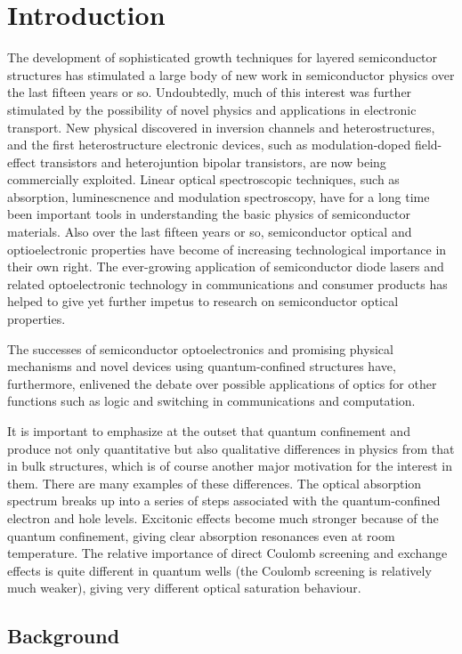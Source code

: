 \chapter{Introduction}

The development of sophisticated growth techniques for layered semiconductor
structures has stimulated a large body of new work in semiconductor physics
over the last fifteen years or so. Undoubtedly, much of this interest was
further stimulated by the possibility of novel physics and applications in
electronic transport. New physical discovered in inversion channels and
heterostructures, and the first heterostructure electronic devices, such as
modulation-doped field-effect transistors and heterojuntion bipolar
transistors, are now being commercially exploited. Linear optical spectroscopic
techniques, such as absorption, luminescnence and modulation spectroscopy, have
for a long time been important tools in understanding the basic physics of
semiconductor materials. Also over the last fifteen years or so, semiconductor
optical and optioelectronic properties have become of increasing technological
importance in their own right. The ever-growing application of semiconductor
diode lasers and related optoelectronic technology in communications and
consumer products has helped to give yet further impetus to research on
semiconductor optical properties. 

The successes of semiconductor optoelectronics and promising physical
mechanisms and novel devices using quantum-confined structures have,
furthermore, enlivened the debate over possible applications of optics for
other functions such as logic and switching in communications and computation.

It is important to emphasize at the outset that quantum confinement and produce
not only quantitative but also qualitative differences in physics from that in
bulk structures, which is of course another major motivation for the interest
in them. There are many examples of these differences. The optical absorption
spectrum breaks up into a series of steps associated with the quantum-confined
electron and hole levels. Excitonic effects become much stronger because of the
quantum confinement, giving clear absorption resonances even at room
temperature. The relative importance of direct Coulomb screening and exchange
effects is quite different in quantum wells (the Coulomb screening is
relatively much weaker), giving very different optical saturation behaviour.

\section{Background} \label{sec:AD}


